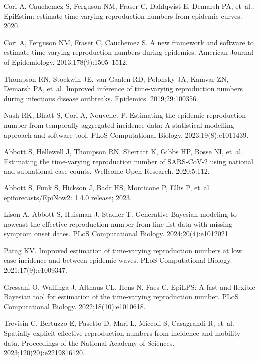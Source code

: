 \documentclass[10pt,letterpaper]{article}
\begin{document}
\begin{thebibliography}{10}
  Cori A, Cauchemez S, Ferguson NM, Fraser C, Dahlqwist E, Demarsh PA, et~al..
    {EpiEstim}: estimate time varying reproduction numbers from epidemic curves.
    2020.
  
  Cori A, Ferguson NM, Fraser C, Cauchemez S.
  \newblock A new framework and software to estimate time-varying reproduction
    numbers during epidemics.
  \newblock American Journal of Epidemiology. 2013;178(9):1505--1512.
  
  Thompson RN, Stockwin JE, van Gaalen RD, Polonsky JA, Kamvar ZN, Demarsh PA,
    et~al.
  \newblock Improved inference of time-varying reproduction numbers during
    infectious disease outbreaks.
  \newblock Epidemics. 2019;29:100356.
  
  Nash RK, Bhatt S, Cori A, Nouvellet P.
  \newblock Estimating the epidemic reproduction number from temporally
    aggregated incidence data: A statistical modelling approach and software
    tool.
  \newblock PLoS Computational Biology. 2023;19(8):e1011439.
  
  Abbott S, Hellewell J, Thompson RN, Sherratt K, Gibbs HP, Bosse NI, et~al.
  \newblock Estimating the time-varying reproduction number of {SARS-CoV-2} using
    national and subnational case counts.
  \newblock Wellcome Open Research. 2020;5:112.
  
  Abbott S, Funk S, Hickson J, Badr HS, Monticone P, Ellis P, et~al..
    epiforecasts/{EpiNow2}: 1.4.0 release; 2023.
  
  Lison A, Abbott S, Huisman J, Stadler T.
  \newblock Generative {B}ayesian modeling to nowcast the effective reproduction
    number from line list data with missing symptom onset dates.
  \newblock PLoS Computational Biology. 2024;20(4):e1012021.
  
  Parag KV.
  \newblock Improved estimation of time-varying reproduction numbers at low case
    incidence and between epidemic waves.
  \newblock PLoS Computational Biology. 2021;17(9):e1009347.
  
  Gressani O, Wallinga J, Althaus CL, Hens N, Faes C.
  \newblock EpiLPS: A fast and flexible {B}ayesian tool for estimation of the
    time-varying reproduction number.
  \newblock PLoS Computational Biology. 2022;18(10):e1010618.
  
  Trevisin C, Bertuzzo E, Pasetto D, Mari L, Miccoli S, Casagrandi R, et~al.
  \newblock Spatially explicit effective reproduction numbers from incidence and
    mobility data.
  \newblock Proceedings of the National Academy of Sciences.
    2023;120(20):e2219816120.
  

\end{thebibliography}
\end{document}
